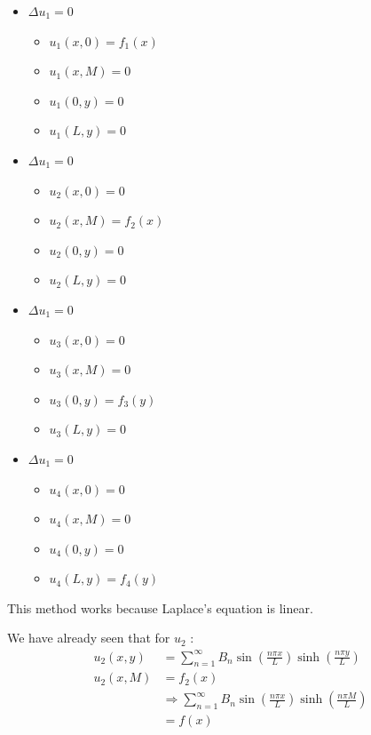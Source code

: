 \documentclass{article}
\begin{document}
\begin{itemize}
  \item $\Delta u_1 = 0$
  \begin{itemize}
    \item $u_1(x, 0) = f_1(x)$
    \item $u_1(x, M) = 0$
    \item $u_1(0, y) = 0$
    \item $u_1(L, y) = 0$
  \end{itemize}
  \item $\Delta u_1 = 0$
  \begin{itemize}
    \item $u_2(x, 0) = 0$
    \item $u_2(x, M) = f_2(x)$
    \item $u_2(0, y) = 0$
    \item $u_2(L, y) = 0$
  \end{itemize}
  \item $\Delta u_1 = 0$
  \begin{itemize}
    \item $u_3(x, 0) = 0$
    \item $u_3(x, M) = 0$
    \item $u_3(0, y) = f_3(y)$
    \item $u_3(L, y) = 0$
  \end{itemize}
  \item $\Delta u_1 = 0$
  \begin{itemize}
    \item $u_4(x, 0) = 0$
    \item $u_4(x, M) = 0$
    \item $u_4(0, y) = 0$
    \item $u_4(L, y) = f_4(y)$
  \end{itemize}
\end{itemize}

This method works because Laplace's equation is linear.

We have already seen that for $u_2$ :
%
\begin{align}
  u_2(x, y) & = \sum^\infty_{n = 1} B_n \sin\left( \frac{n \pi x}{L} \right) \sinh\left( \frac{n \pi y}{L} \right)\\
  u_2(x, M) & = f_2(x)\\
  & \Rightarrow \sum^\infty_{n = 1} B_n \sin\left ( \frac{n \pi x}{L} \right) \sinh\left( \frac{n \pi M}{L} \right)\\
  & = f(x)
\end{align}
\end{document}
